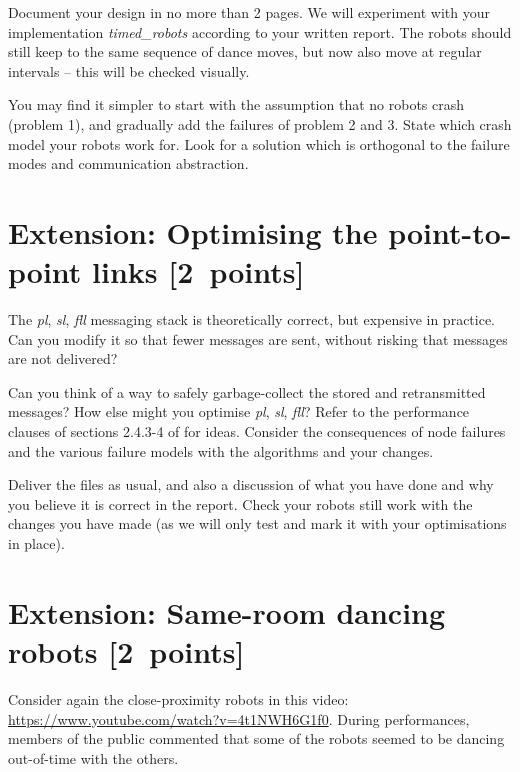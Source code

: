 \documentclass[a4paper]{article}
\begin{document}
Document your design in no more than 2 pages. We will experiment with your
implementation \emph{timed\_robots} according to your written report.
The robots should still keep to the same sequence of dance moves, but now also
move at regular intervals -- this will be checked visually.

You may find it simpler to start with the assumption that no robots crash
(problem 1), and gradually add the failures of problem 2 and 3. State which
crash model your robots work for. Look for a solution which is orthogonal to
the failure modes and communication abstraction.







\section*{Extension: Optimising the point-to-point links [2~points]} %
\label{sec:extension_optimising_the_link_channels}

The \emph{pl}, \emph{sl}, \emph{fll} messaging stack is theoretically correct,
but expensive in practice. Can you modify it so that fewer messages are sent,
without risking that messages are not delivered?

Can you think of a way to safely garbage-collect the stored and retransmitted
messages? How else might you optimise \emph{pl}, \emph{sl}, \emph{fll}? Refer to the
performance clauses of sections 2.4.3-4 of \cite{cachin2011} for ideas.
Consider the consequences of node failures and the various failure models
with the algorithms and your changes.

Deliver the files as usual, and also a discussion of what you have done and
why you believe it is correct in the report. Check your robots still work
with the changes you have made (as we will only test and mark it with your
optimisations in place).







\section*{Extension: Same-room dancing robots [2~points]} %
\label{sec:extension_same_room_dancing_robots}

Consider again the close-proximity robots in this video:
\url{https://www.youtube.com/watch?v=4t1NWH6G1f0}. During performances,
members of the public commented that some of the robots seemed to be dancing
out-of-time with the others.
\end{document}
